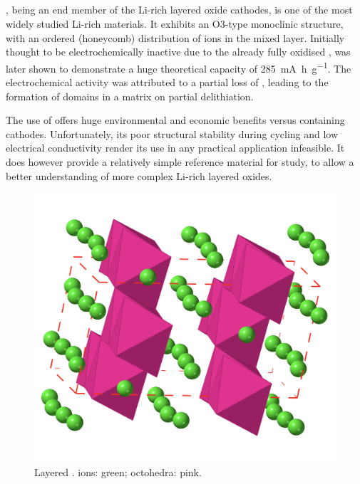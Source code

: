 \subsection{}
, being an end member of the Li-rich layered oxide cathodes, is one of the most widely studied Li-rich materials.
It exhibits an O3-type monoclinic structure, with an ordered (honeycomb) distribution of  ions in the mixed  layer.\cite{Rozier2015}
Initially thought to be electrochemically inactive due to the already fully oxidised ,  was later shown to  demonstrate a huge theoretical capacity of \SI{285}{\milli\ampere\hour\per\gram}.\cite{Thackeray2005, Chen2016b}
The electrochemical activity was attributed to a partial loss of , leading to the formation of  domains in a  matrix on partial delithiation.

The use of  offers huge environmental and economic benefits versus  containing cathodes.
Unfortunately, its poor structural stability during cycling and low electrical conductivity render its use in any practical application infeasible.
It does however provide a relatively simple reference material for study, to allow a better understanding of more complex Li-rich layered oxides.





\begin{figure}
\centering
\includegraphics[width=0.6\linewidth]{figures/structures/Li2MnO3}
\caption[]{Layered .  ions: green;  octohedra: pink.} 
\label{fig:Li2MnO3}
\end{figure}





\newpage

